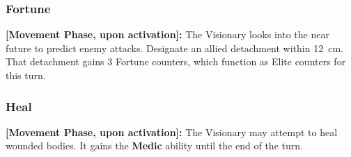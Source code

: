 \subsubsection{Fortune}

\textbf{[Movement Phase, upon activation]:} The Visionary looks into the near future to predict enemy attacks. Designate an allied detachment within 12~cm. That detachment gains 3 Fortune counters, which function as Elite counters for this turn.

\subsubsection{Heal}

\textbf{[Movement Phase, upon activation]:} The Visionary may attempt to heal wounded bodies. It gains the \textbf{Medic} ability until the end of the turn.
